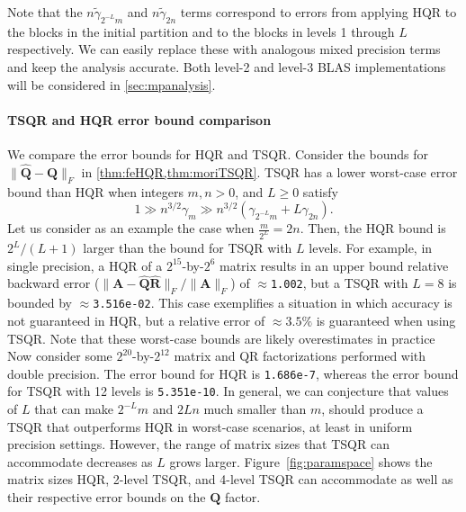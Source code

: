 \documentclass[review,onefignum,onetabnum]{siamart190516}
\newcommand{\bb}[1]{\mathbf{#1}}
\begin{document}
Note that the $n\tilde{\gamma}_{2^{-L}m}$ and $n\tilde{\gamma}_{ 2n}$ terms correspond to errors from applying HQR to the blocks in the initial partition and to the blocks in levels 1 through $L$ respectively.
We can easily replace these with analogous mixed precision terms and keep the analysis accurate.
Both level-2 and level-3 BLAS implementations will be considered in \cref{sec:mpanalysis}.
\paragraph{TSQR and HQR error bound comparison}
We compare the error bounds for HQR and TSQR. 
Consider the bounds for $\|\hat{\bb{Q}}-\bb{Q}\|_F$ in \cref{thm:feHQR,thm:moriTSQR}.
TSQR has a lower worst-case error bound than HQR when integers $m, n > 0$, and $L\geq0$ satisfy
\begin{equation*}
1\gg n^{3/2}\gamma_m \gg n^{3/2}(\gamma_{2^{-L}m}+L\gamma_{2n}).
\end{equation*}
Let us consider as an example the case when $\frac{m}{2^L}=2n$.
Then, the HQR bound is $2^L/(L+1)$ larger than the bound for TSQR with $L$ levels.
For example, in single precision, a HQR of a $2^{15}$-by-$2^6$ matrix results in an upper bound relative backward error ($\|\bb{A}-\hat{\bb{Q}}\hat{\bb{R}}\|_F/\|\bb{A}\|_F$) of $\approx${\tt1.002}, but a TSQR with $L=8$ is bounded by $\approx${\tt 3.516e-02}. 
This case exemplifies a situation in which accuracy is not guaranteed in HQR, but a relative error of $\approx 3.5\%$ is guaranteed when using TSQR. 
Note that these worst-case bounds are likely overestimates in practice
Now consider some $2^{20}$-by-$2^{12}$ matrix and QR factorizations performed with double precision.
The error bound for HQR is {\tt 1.686e-7}, whereas the error bound for TSQR with 12 levels is {\tt 5.351e-10}.
In general, we can conjecture that values of $L$ that can make $2^{-L}m$ and $2Ln$ much smaller than $m$, should produce a TSQR that outperforms HQR in worst-case scenarios, at least in uniform precision settings.
However, the range of matrix sizes that TSQR can accommodate decreases as $L$ grows larger.
Figure~\ref{fig:paramspace} shows the matrix sizes HQR, 2-level TSQR, and 4-level TSQR can accommodate as well as their respective error bounds on the $\bb{Q}$ factor.\par
\end{document}
